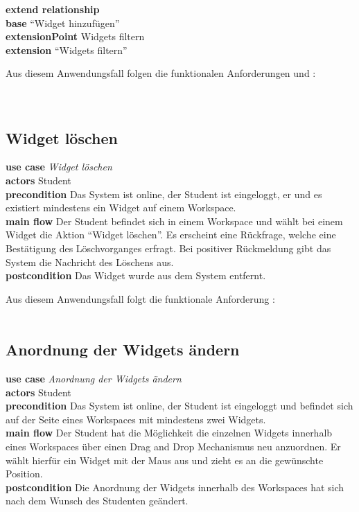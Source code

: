 \textbf{extend relationship}\\
\textbf{base} "`Widget hinzufügen"'\\
\textbf{extensionPoint} Widgets filtern\\
\textbf{extension} "`Widgets filtern"'
 
Aus diesem Anwendungsfall folgen die funktionalen Anforderungen  und :\\
\requirement{\requirementWidgetFilterName}\label{requirementWidgetFilterName}\\
\requirement{\requirementWidgetFilterOnline}\label{requirementWidgetFilterOnline}\\
 
\subsection{Widget löschen}
\textbf{use case} \emph{Widget löschen}\\
\textbf{actors} Student\\
\textbf{precondition} Das System ist online, der Student ist eingeloggt, er und es existiert mindestens ein Widget auf einem Workspace.\\
\textbf{main flow} Der Student befindet sich in einem Workspace und wählt bei einem Widget die Aktion "`Widget löschen"'. Es erscheint eine Rückfrage, welche eine Bestätigung des Löschvorganges erfragt. Bei positiver Rückmeldung gibt das System die Nachricht des Löschens aus.\\
\textbf{postcondition} Das Widget wurde aus dem System entfernt.
 
Aus diesem Anwendungsfall folgt die funktionale Anforderung :\\
\requirement{\requirementWidgetDelete}\label{requirementWidgetDelete}\\
 
\subsection{Anordnung der Widgets ändern}
\textbf{use case} \emph{Anordnung der Widgets ändern}\\
\textbf{actors} Student\\
\textbf{precondition} Das System ist online, der Student ist eingeloggt und befindet sich auf der Seite eines Workspaces mit mindestens zwei Widgets.\\
\textbf{main flow} Der Student hat die Möglichkeit die einzelnen Widgets innerhalb eines Workspaces über einen Drag and Drop Mechanismus neu anzuordnen. Er wählt hierfür ein Widget mit der Maus aus und zieht es an die gewünschte Position.\\
\textbf{postcondition} Die Anordnung der Widgets innerhalb des Workspaces hat sich nach dem Wunsch des Studenten geändert.
 
